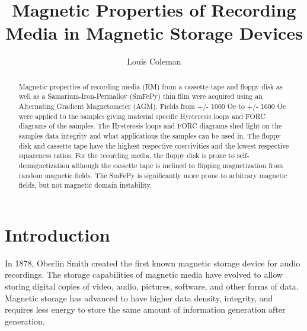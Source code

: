 \documentclass[aps,twocolumn,groupedaddress]{revtex4}
\begin{document}
\title{Magnetic Properties of Recording Media in Magnetic Storage Devices}

\author{Louis Coleman}

\begin{abstract}
Magnetic properties of recording media (RM) from a cassette tape and floppy disk as well as a Samarium-Iron-Permalloy (SmFePy) thin film were acquired using an Alternating Gradient Magnetometer (AGM). Fields from +/- 1000 Oe to +/- 1600 Oe were applied to the samples giving material specific Hysteresis loops and FORC diagrams of the samples. The Hysteresis loops and FORC diagrams shed light on the samples data integrity and what applications the samples can be used in. The floppy disk and cassette tape have the highest respective coercivities and the lowest respective squareness ratios. For the recording media, the floppy disk is prone to self-demagnetization although the cassette tape is inclined to flipping magnetization from random magnetic fields. The SmFePy is significantly more prone to arbitrary magnetic fields, but not magnetic domain instability.
\end{abstract}

\maketitle

\section{Introduction}
In 1878, Oberlin Smith created the first known magnetic storage device for audio recordings. The storage capabilities of magnetic media have evolved to allow storing digital copies of video, audio, pictures, software, and other forms of data.  Magnetic storage has advanced to have higher data density, integrity, and requires less energy to store the same amount of information generation after generation.
\end{document}
